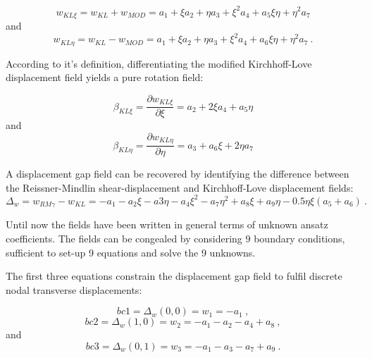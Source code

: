 \begin{equation} 
w_{KL \xi} = w_{KL} + w_{MOD} = a_1 + \xi a_2 + \eta a_3 + \xi^2 a_4 +a_5 \xi \eta + \eta^2 a_7
\label{eqDSGc3_4}
\end{equation}
and
\begin{equation} 
w_{KL \eta} = w_{KL} - w_{MOD} = a_1 + \xi a_2 + \eta a_3 + \xi^2 a_4 +a_6 \xi \eta + \eta^2 a_7
\label{eqDSGc3_5}\ .
\end{equation}

According to it's definition, differentiating the modified Kirchhoff-Love displacement field yields a pure rotation field:

\begin{equation} 
\beta_{KL \xi} = \frac{\partial w_{KL \xi}}{\partial \xi}  = a_2 + 2 \xi a_4 +a_5 \eta
\label{eqDSGc3_8}
\end{equation}
and
\begin{equation} 
\beta_{KL \eta} = \frac{\partial w_{KL \eta}}{\partial \eta}  =a_3 +a_6 \xi + 2 \eta a_7
\label{eqDSGc3_9}
\end{equation}

A displacement gap field can be recovered by identifying the difference between the Reissner-Mindlin shear-displacement and Kirchhoff-Love displacement fields:
\begin{equation} 
\Delta_w = w_{RM\gamma} - w_{KL}  =-a_1 - a_2\xi - a3\eta - a_4\xi^2 - a_7\eta^2 + a_8\xi + a_9\eta - 0.5\eta\xi(a_5 + a_6)
\label{eqDSGc3_10}\ .
\end{equation}

Until now the fields have been written in general terms of unknown ansatz coefficients. The fields can be congealed by considering 9 boundary conditions, sufficient to set-up 9 equations and solve the 9 unknowns.

The first three equations constrain the displacement gap field to fulfil discrete nodal transverse displacements:

\begin{equation} 
bc1 = \Delta_w(0,0) = w_1 = -a_1
\label{eqDSGc3_11}\ ,
\end{equation}
\begin{equation} 
bc2 = \Delta_w(1,0) = w_2 = -a_1 -a_2 -a_4 + a_8
\label{eqDSGc3_12}\ ,
\end{equation}
and
\begin{equation} 
bc3 = \Delta_w(0,1) = w_3 = -a_1 -a_3 -a_7 + a_9
\label{eqDSGc3_13}\ .
\end{equation}

